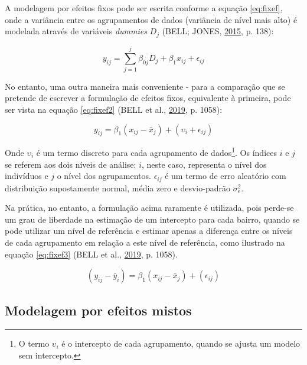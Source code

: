 \documentclass[
  a4paper, 12pt]{article}
\begin{document}
A modelagem por efeitos fixos pode ser escrita conforme a equação
\ref{eq:fixef}, onde a variância entre os agrupamentos de dados
(variância de nível mais alto) é modelada através de variáveis
\emph{dummies} \(D_j\) (BELL; JONES,
\protect\hyperlink{ref-bell2015}{2015}, p. 138):

\begin{equation} \label{eq:fixef}
y_{ij} = \sum_{j=1}^{j}\beta_{0j}D_j + \beta_1 x_{ij} + \epsilon_{ij}
\end{equation}

No entanto, uma outra maneira mais conveniente - para a comparação que
se pretende de escrever a formulação de efeitos fixos, equivalente à
primeira, pode ser vista na equação \ref{eq:fixef2} (BELL et al.,
\protect\hyperlink{ref-bell2019}{2019}, p. 1058):

\begin{equation} \label{eq:fixef2}
y_{ij} = \beta_1 (x_{ij} - \bar{x}_j) + (\upsilon_i + \epsilon_{ij}) 
\end{equation}

Onde \(\upsilon_i\) é um termo discreto para cada agrupamento de
dados\footnote{O termo \(\upsilon_i\) é o intercepto de cada
  agrupamento, quando se ajusta um modelo sem intercepto.}. Os índices
\(i\) e \(j\) se referem aos dois níveis de análise: \(i\), neste caso,
representa o nível dos indivíduos e \(j\) o nível dos agrupamentos.
\(\epsilon_{ij}\) é um termo de erro aleatório com distribuição
supostamente normal, média zero e desvio-padrão \(\sigma_{\epsilon}^2\).

Na prática, no entanto, a formulação acima raramente é utilizada, pois
perde-se um grau de liberdade na estimação de um intercepto para cada
bairro, quando se pode utilizar um nível de referência e estimar apenas
a diferença entre os níveis de cada agrupamento em relação a este nível
de referência, como ilustrado na equação \ref{eq:fixef3} (BELL et al.,
\protect\hyperlink{ref-bell2019}{2019}, p. 1058).

\begin{equation} \label{eq:fixef3}
(y_{ij} - \bar{y}_i) = \beta_1 (x_{ij} - \bar{x}_j) + (\epsilon_{ij}) 
\end{equation}

\hypertarget{modelagem-por-efeitos-mistos}{%
\subsection{Modelagem por efeitos
mistos}\label{modelagem-por-efeitos-mistos}}
\end{document}

